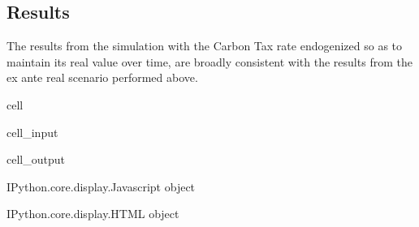 \documentclass[letterpaper,10pt,english]{jupyterBook}
\begin{document}
\subsection{Results}
\label{\detokenize{content/05_WBModels/MoreComplexScenarios:results}}
\sphinxAtStartPar
The results from the simulation with the Carbon Tax rate endogenized so as to maintain its real value over time, are broadly consistent with the results from the ex ante real scenario performed above.

\begin{sphinxuseclass}{cell}\begin{sphinxVerbatimInput}

\begin{sphinxuseclass}{cell_input}
\begin{sphinxVerbatim}[commandchars=\\\{\}]
 
\end{sphinxVerbatim}

\end{sphinxuseclass}\end{sphinxVerbatimInput}
\begin{sphinxVerbatimOutput}

\begin{sphinxuseclass}{cell_output}
\begin{sphinxVerbatim}[commandchars=\\\{\}]
\PYGZlt{}IPython.core.display.Javascript object\PYGZgt{}
\end{sphinxVerbatim}

\begin{sphinxVerbatim}[commandchars=\\\{\}]
\PYGZlt{}IPython.core.display.HTML object\PYGZgt{}
\end{sphinxVerbatim}

\end{sphinxuseclass}\end{sphinxVerbatimOutput}

\end{sphinxuseclass}
\sphinxstepscope
\end{document}

